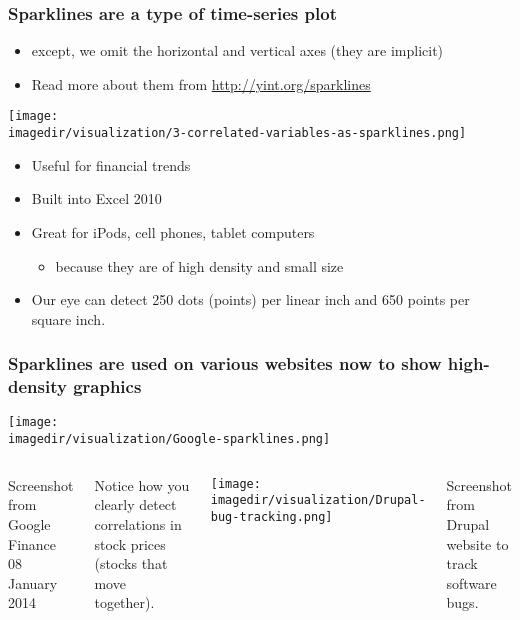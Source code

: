 \begin{frame}\frametitle{Sparklines are a type of time-series plot}
	
	\begin{itemize}
		\item	except, we omit the horizontal and vertical axes (they are implicit)
		\item	Read more about them from \href{http://yint.org/sparklines}{http://yint.org/sparklines}
	\end{itemize}
	
	\begin{exampleblock}{}
		\centerline{\texttt{[image: \\imagedir/visualization/3-correlated-variables-as-sparklines.png]}}
	\end{exampleblock}
	
	
	\begin{itemize}
		\item	Useful for financial trends 
		\item	Built into Excel 2010 
		\item	Great for iPods, cell phones, tablet computers
		\begin{itemize}
			\item	because they are of high density and small size
		\end{itemize}
		\item	Our eye can detect 250 dots (points) per linear inch and 650 points per square inch.
	\end{itemize}
\end{frame}

\begin{frame}\frametitle{Sparklines are used on various websites now to show high-density graphics}

	\centerline{\texttt{[image: \\imagedir/visualization/Google-sparklines.png]}}
	\begin{columns}[T]
		
			{\scriptsize Screenshot from Google Finance 08 January 2014}	

			\vspace{5pt}
			Notice how you clearly detect correlations in stock prices (stocks that move together).
			
		
			\vspace{-12pt}
			\centerline{\texttt{[image: \\imagedir/visualization/Drupal-bug-tracking.png]}}
			{\scriptsize  Screenshot from Drupal website to track software bugs.}
	\end{columns}
\end{frame}

